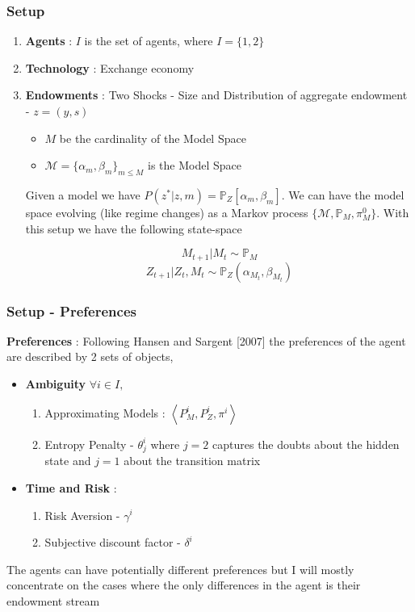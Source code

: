 \documentclass{beamer}
\begin{document}


\begin{frame}
\frametitle{Setup}
	\begin{enumerate}
		\item \textbf{Agents}  : $I$ is the  set of agents, where $I= \{1,2\}$
		\item \textbf{Technology} : Exchange economy

		\item \textbf{Endowments}  : Two Shocks - Size and
                  Distribution of aggregate endowment - $z=(y,s)$

\begin{itemize}
\item $M$ be the cardinality of the Model Space
\item $\mathcal{M}=\{\alpha_m,\beta_m\}_{m\leq M}$ is the Model Space
\end{itemize}

Given a model we have $P(z^*|z,m)=\mathbb{P}_{Z}[\alpha_m,\beta_m]$. We can have the model space evolving (like regime changes) as a Markov process $\{\mathcal{M},\mathbb{P}_{M},\pi^0_{M}\}$. With this setup we have the following state-space

\[M_{t+1} | M_t \sim \mathbb{P}_{M}\]
\[Z_{t+1}|Z_t,M_t \sim \mathbb{P}_{Z}(\alpha_{M_t},\beta_{M_t})\]
 	\end{enumerate}
\end{frame}

\begin{frame}
\frametitle{Setup - Preferences}
\textbf{Preferences} : Following Hansen and Sargent [2007] the preferences of the agent are described by 2 sets of objects, 
\begin{itemize}
	\item \textbf{Ambiguity}
%	
$\forall i \in I,$
\begin{enumerate}
	\item Approximating Models :   $\left\langle  P^i_M,P_Z^i, \pi^i \right\rangle$
	\item Entropy Penalty - $\theta_j^i$ where $j=2$ captures the doubts about the hidden state and $j=1$ about the transition matrix
\end{enumerate}
\item \textbf{Time and Risk} :
\begin{enumerate}
	\item Risk Aversion - $\gamma^i$
	\item Subjective discount factor - $\delta^i$
\end{enumerate}
 \end{itemize}

\small{The agents can have potentially different preferences but I will mostly concentrate on the cases where the only differences in the agent is their endowment stream}
%
\end{frame}
\end{document}
